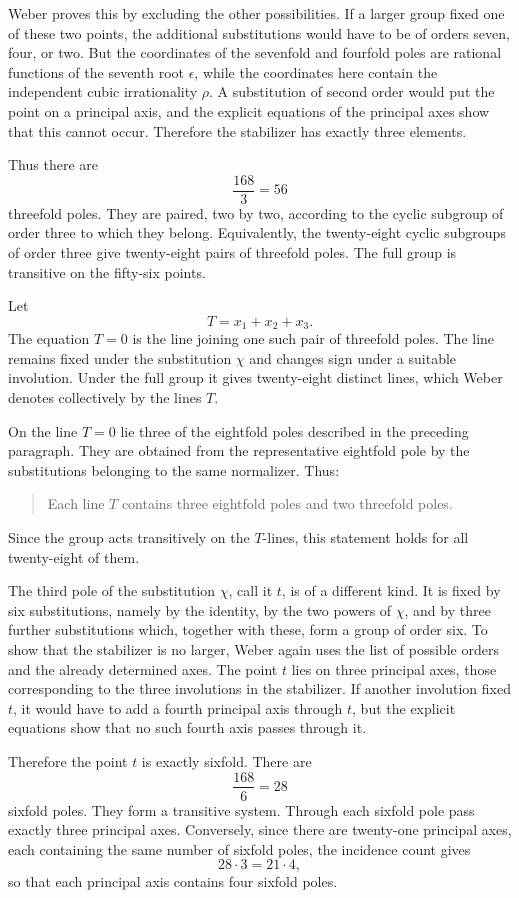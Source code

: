 \documentclass[11pt,a4paper]{book}
\begin{document}
Weber proves this by excluding the other possibilities.  If a larger group fixed one of these two points, the additional substitutions would have to be of orders seven, four, or two.  But the coordinates of the sevenfold and fourfold poles are rational functions of the seventh root \(\epsilon\), while the coordinates here contain the independent cubic irrationality \(\rho\).  A substitution of second order would put the point on a principal axis, and the explicit equations of the principal axes show that this cannot occur.  Therefore the stabilizer has exactly three elements.

Thus there are
\[
 \frac{168}{3}=56
\]
threefold poles.  They are paired, two by two, according to the cyclic subgroup of order three to which they belong.  Equivalently, the twenty-eight cyclic subgroups of order three give twenty-eight pairs of threefold poles.  The full group is transitive on the fifty-six points.

Let
\[
 T=x_1+x_2+x_3.
\]
The equation \(T=0\) is the line joining one such pair of threefold poles.  The line remains fixed under the substitution \(\chi\) and changes sign under a suitable involution.  Under the full group it gives twenty-eight distinct lines, which Weber denotes collectively by the lines \(T\).

On the line \(T=0\) lie three of the eightfold poles described in the preceding paragraph.  They are obtained from the representative eightfold pole by the substitutions belonging to the same normalizer.  Thus:
\begin{quote}
Each line \(T\) contains three eightfold poles and two threefold poles.
\end{quote}
Since the group acts transitively on the \(T\)-lines, this statement holds for all twenty-eight of them.

The third pole of the substitution \(\chi\), call it \(t\), is of a different kind.  It is fixed by six substitutions, namely by the identity, by the two powers of \(\chi\), and by three further substitutions which, together with these, form a group of order six.  To show that the stabilizer is no larger, Weber again uses the list of possible orders and the already determined axes.  The point \(t\) lies on three principal axes, those corresponding to the three involutions in the stabilizer.  If another involution fixed \(t\), it would have to add a fourth principal axis through \(t\), but the explicit equations show that no such fourth axis passes through it.

Therefore the point \(t\) is exactly sixfold.  There are
\[
 \frac{168}{6}=28
\]
sixfold poles.  They form a transitive system.  Through each sixfold pole pass exactly three principal axes.  Conversely, since there are twenty-one principal axes, each containing the same number of sixfold poles, the incidence count gives
\[
 28\cdot 3=21\cdot 4,
\]
so that each principal axis contains four sixfold poles.
\end{document}
